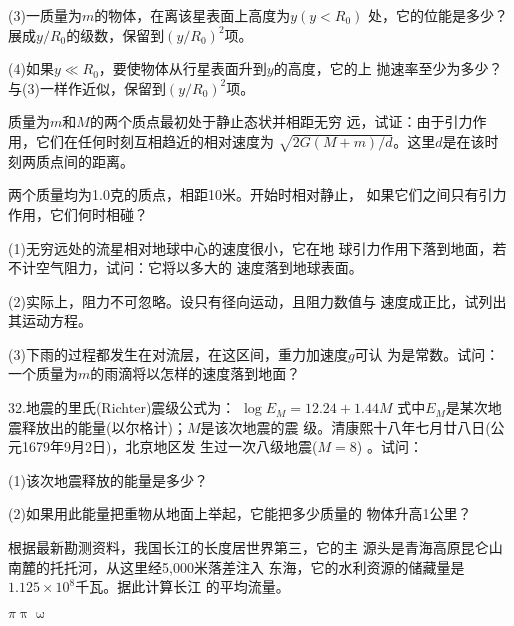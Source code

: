 \begin{exercises}
(3)一质量为$ m $的物体，在离该星表面上高度为$ y ( y < R _ { 0 } ) $
处，它的位能是多少？\lhbrak 展成$ y / R _ { 0 } $的级数，保留到$ ( y / R _ { 0 } ) ^ { 2 } $项。\rhbrak

(4)如果$ y \ll R _ { 0 } $，要使物体从行星表面升到$ y $的高度，它的上
抛速率至少为多少？\lhbrak 与(3)一样作近似，保留到$ ( y / R _ { 0 } ) ^ { 2 } $项。\rhbrak

\exercise 质量为$ m $和$ M $的两个质点最初处于静止态状并相距无穷
远，试证：由于引力作用，它们在任何时刻互相趋近的相对速度为
$ \sqrt { 2 G ( M + m ) / d } $。这里$ d $是在该时刻两质点间的距离。

\exercise 两个质量均为1.0克的质点，相距10米。开始时相对静止，
如果它们之间只有引力作用，它们何时相碰？

\exercise (1)无穷远处的流星相对地球中心的速度很小，它在地
球引力作用下落到地面，若不计空气阻力，试问：它将以多大的
速度落到地球表面。

(2)实际上，阻力不可忽略。设只有径向运动，且阻力数值与
速度成正比，试列出其运动方程。

(3)下雨的过程都发生在对流层，在这区间，重力加速度$ g $可认
为是常数。试问：一个质量为$ m $的雨滴将以怎样的速度落到地面？

32.地震的里氏(Richter)震级公式为：
$ \log E _ { M } = 12.24 + 1.44 M $
式中$ E _ { M } $是某次地震释放出的能量(以尔格计)；$ M $是该次地震的震
级。清康熙十八年七月廿八日(公元1679年9月2日)，北京地区发
生过一次八级地震($ M = 8 $) 。试问：

(1)该次地震释放的能量是多少？

(2)如果用此能量把重物从地面上举起，它能把多少质量的
物体升高1公里？

\exercise 根据最新勘测资料，我国长江的长度居世界第三，它的主
源头是青海高原昆仑山南麓的托托河，从这里经5,000米落差注入
东海，它的水利资源的储藏量是$ 1.125 \times 10 ^ { 8 } $千瓦。据此计算长江
的平均流量。

$ \pi \uppi \upomega $

\end{exercises}